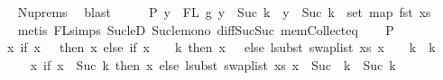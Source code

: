 \begin{isabellebody}
\ \ \ \ \isamarkupfalse%
\ Nu{\isachardot}{\kern0pt}prems{\isacharparenleft}{\kern0pt}{}{\isacharparenright}{\kern0pt}\ \isamarkupfalse%
\ blast\isanewline
\ \ \isamarkupfalse%
\ \isamarkupfalse%
\ P{}{\isacharcolon}{\kern0pt}\ {\isachardoublequoteopen}{\isasymforall}y\ {\isasymin}\ FL\ g{\isacharprime}{\kern0pt}{\isachardot}{\kern0pt}\ y\ {\isachargreater}{\kern0pt}{\isacharequal}{\kern0pt}\ Suc\ k\ {\isacharminus}{\kern0pt}{\isacharminus}{\kern0pt}{\isachargreater}{\kern0pt}\ y\ {\isacharminus}{\kern0pt}\ {\isacharparenleft}{\kern0pt}Suc\ k{\isacharparenright}{\kern0pt}\ {\isasymin}\ set\ {\isacharparenleft}{\kern0pt}map\ fst\ xs{\isacharparenright}{\kern0pt}{\isachardoublequoteclose}\isanewline
\ \ \ \ \isamarkupfalse%
\ {\isacharparenleft}{\kern0pt}metis\ FL{\isachardot}{\kern0pt}simps{\isacharparenleft}{\kern0pt}{}{\isacharparenright}{\kern0pt}\ Suc{\isacharunderscore}{\kern0pt}le{\isacharunderscore}{\kern0pt}D\ Suc{\isacharunderscore}{\kern0pt}le{\isacharunderscore}{\kern0pt}mono\ diff{\isacharunderscore}{\kern0pt}Suc{\isacharunderscore}{\kern0pt}Suc\ mem{\isacharunderscore}{\kern0pt}Collect{\isacharunderscore}{\kern0pt}eq{\isacharparenright}{\kern0pt}\isanewline
\isanewline
\ \ \isamarkupfalse%
\ P{}{\isacharcolon}{\kern0pt}\isanewline
\ \ \ \ {\isachardoublequoteopen}{\isacharparenleft}{\kern0pt}{\isasymlambda}x{\isachardot}{\kern0pt}\ if\ x\ {\isacharequal}{\kern0pt}\ {}\ then\ x\ else\ {\isacharparenleft}{\kern0pt}if\ x\ {\isacharminus}{\kern0pt}\ {}\ {\isacharless}{\kern0pt}\ k\ then\ x\ {\isacharminus}{\kern0pt}\ {}\ else\ lsubst\ {\isacharparenleft}{\kern0pt}swap{\isacharunderscore}{\kern0pt}list\ xs{\isacharparenright}{\kern0pt}\ {\isacharparenleft}{\kern0pt}x\ {\isacharminus}{\kern0pt}\ {}\ {\isacharminus}{\kern0pt}\ k{\isacharparenright}{\kern0pt}\ {\isacharplus}{\kern0pt}\ k{\isacharparenright}{\kern0pt}\ {\isacharplus}{\kern0pt}\ {}{\isacharparenright}{\kern0pt}\ {\isacharequal}{\kern0pt}\isanewline
\ \ \ \ {\isacharparenleft}{\kern0pt}{\isasymlambda}x{\isachardot}{\kern0pt}\ if\ x\ {\isacharless}{\kern0pt}\ Suc\ k\ then\ x\ else\ lsubst\ {\isacharparenleft}{\kern0pt}swap{\isacharunderscore}{\kern0pt}list\ xs{\isacharparenright}{\kern0pt}\ {\isacharparenleft}{\kern0pt}x\ {\isacharminus}{\kern0pt}\ {\isacharparenleft}{\kern0pt}Suc\ \ k{\isacharparenright}{\kern0pt}{\isacharparenright}{\kern0pt}\ {\isacharplus}{\kern0pt}\ {\isacharparenleft}{\kern0pt}Suc\ k{\isacharparenright}{\kern0pt}{\isacharparenright}{\kern0pt}{\isachardoublequoteclose}\isanewline

\end{isabellebody}
